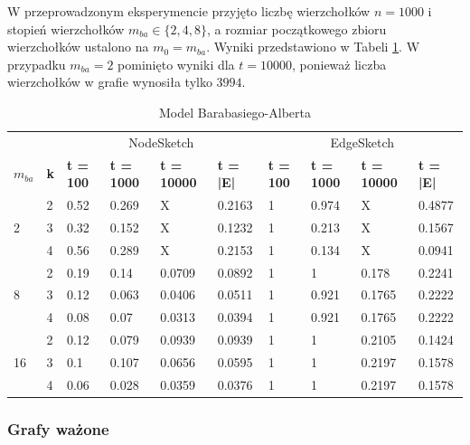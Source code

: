     W przeprowadzonym eksperymencie przyjęto liczbę wierzchołków $n = 1000$ i stopień wierzchołków $m_{ba} \in \{2,4,8\}$, a rozmiar początkowego zbioru wierzchołków ustalono na $m_0 = m_{ba}$. Wyniki przedstawiono w Tabeli \ref{tab:barabasi_albert}. W przypadku $m_{ba} = 2$ pominięto wyniki dla $t = 10000$, ponieważ liczba wierzchołków w grafie wynosiła tylko $3994$.
    \begin{table}[!ht]
        \small
        \centering
        \begin{tabular}{|l|l|l|l|l|l|l|l|l|l|}
        \hline
            & & \multicolumn{4}{c|}{NodeSketch} & \multicolumn{4}{c|}{EdgeSketch} \\ \cline{1-10}
            \textbf{$m_{ba}$} & \textbf{k} & \textbf{t = 100} & \textbf{t = 1000} & \textbf{t = 10000} & \textbf{t = |E|} & \textbf{t = 100} & \textbf{t = 1000} & \textbf{t = 10000} & \textbf{t = |E|} \\ \hline\hline
            \multirow{3}{*}{2} & 2 & 0.52 & 0.269 & X & 0.2163 & 1 & 0.974 & X & 0.4877 \\ \cline{2-10}
            & 3 & 0.32 & 0.152 & X & 0.1232 & 1 & 0.213 & X & 0.1567 \\ \cline{2-10}
            & 4 & 0.56 & 0.289 & X & 0.2153 & 1 & 0.134 & X & 0.0941 \\ \hline\hline
            \multirow{3}{*}{8} & 2 & 0.19 & 0.14 & 0.0709 & 0.0892 & 1 & 1 & 0.178 & 0.2241 \\ \cline{2-10}
            & 3 & 0.12 & 0.063 & 0.0406 & 0.0511 & 1 & 0.921 & 0.1765 & 0.2222 \\ \cline{2-10}
            & 4 & 0.08 & 0.07 & 0.0313 & 0.0394 & 1 & 0.921 & 0.1765 & 0.2222 \\ \hline\hline
            \multirow{3}{*}{16} & 2 & 0.12 & 0.079 & 0.0939 & 0.0939 & 1 & 1 & 0.2105 & 0.1424 \\ \cline{2-10}
            & 3 & 0.1 & 0.107 & 0.0656 & 0.0595 & 1 & 1 & 0.2197 & 0.1578 \\ \cline{2-10}
            & 4 & 0.06 & 0.028 & 0.0359 & 0.0376 & 1 & 1 & 0.2197 & 0.1578 \\ \hline
        \end{tabular}
        \caption{Model Barabasiego-Alberta}
        \label{tab:barabasi_albert}
    \end{table}

    \subsubsection{Grafy ważone}

